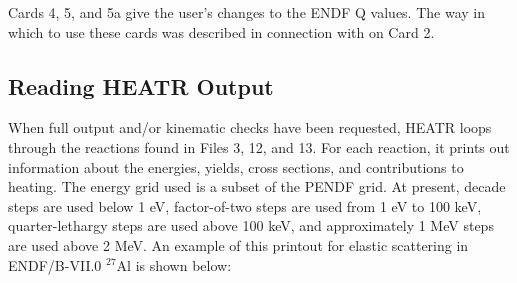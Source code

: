 Cards 4, 5, and 5a give the user's changes to the ENDF Q
values.  The way in which to use these cards was described
in connection with  on Card 2.

\subsection{Reading HEATR Output}
\label{ssHEATR_output}

When full output and/or kinematic checks have been requested,
HEATR loops through the reactions found in Files 3, 12, and 13.
For each reaction, it prints out information about the energies,
yields, cross sections, and contributions to heating.
The energy grid used is a subset of the PENDF grid.
At present, decade steps are used below 1 eV, factor-of-two
steps are used from 1 eV to 100 keV, quarter-lethargy steps
are used above 100 keV, and approximately 1 MeV steps are used
above 2 MeV.  An example of this printout for elastic scattering
in ENDF/B-VII.0 $^{27}$Al is shown below:

